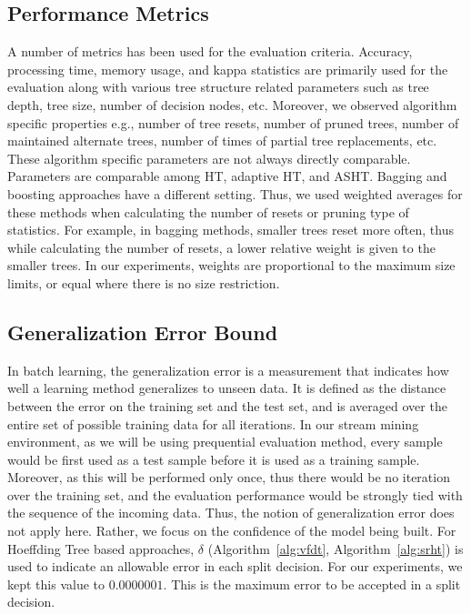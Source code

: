 \subsection{Performance Metrics}
A number of metrics has been used for the evaluation criteria. Accuracy, processing time, memory usage, and kappa statistics are primarily used for the evaluation along with various tree structure related parameters such as tree depth, tree size, number of decision nodes, etc. Moreover, we observed algorithm specific properties e.g., number of tree resets, number of pruned trees, number of maintained alternate trees, number of times of partial tree replacements, etc. These algorithm specific parameters are not always directly comparable. Parameters are comparable among HT, adaptive HT, and ASHT. Bagging and boosting approaches have a different setting. Thus, we used weighted averages for these methods when calculating the number of resets or pruning type of statistics. For example, in bagging methods, smaller trees reset more often, thus while calculating the number of resets, a lower relative weight is given to the smaller trees. In our experiments, weights are proportional to the maximum size limits, or equal where there is no size restriction.

\subsection{Generalization Error Bound}
In batch learning, the generalization error is a measurement that indicates how well a learning method generalizes to unseen data. It is defined as the distance between the error on the training set and the test set, and is averaged over the entire set of possible training data for all iterations. In our stream mining environment, as we will be using prequential evaluation method, every sample would be first used as a test sample before it is used as a training sample. Moreover, as this will be performed only once, thus there would be no iteration over the training set, and the evaluation performance would be strongly tied with the sequence of  the incoming data. Thus, the notion of generalization error does not apply here. Rather, we focus on the confidence of the model being built. For Hoeffding Tree based approaches, $\delta$ (Algorithm~\ref{alg:vfdt}, Algorithm~\ref{alg:srht}) is used to indicate an allowable error in each split decision. For our experiments, we kept this value to $0.0000001$. This is the maximum error to be accepted in a split decision. 

